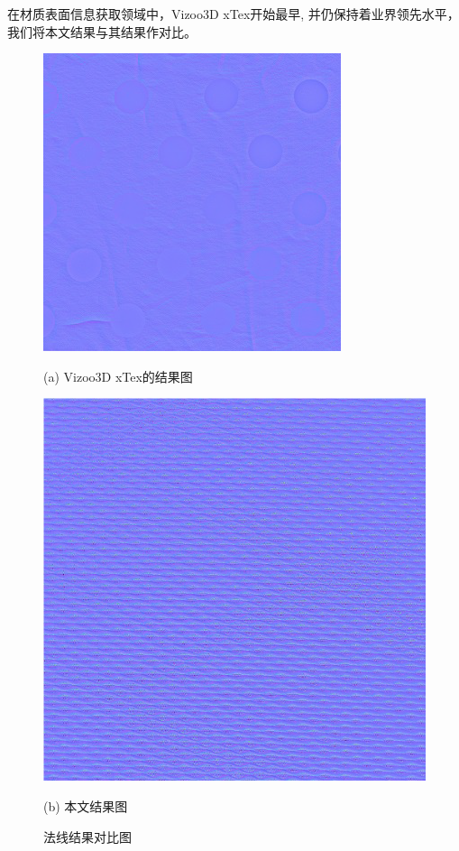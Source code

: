 在材质表面信息获取领域中，Vizoo3D xTex开始最早, 
并仍保持着业界领先水平，我们将本文结果与其结果作对比。
\begin{figure}[htbp]
\begin{minipage}{0.48\linewidth}
\centerline{\includegraphics[width=1.0\linewidth]{figures/faxianduibia.png}}
\centerline{(a) Vizoo3D xTex的结果图 }
\end{minipage}
\begin{minipage}{0.48\linewidth}
\centerline{\includegraphics[width=1.0\linewidth]{figures/faxianduibib.png}}
\centerline{(b) 本文结果图}
\end{minipage}
\caption{法线结果对比图}
\label{fig:faxianjieguoduibi}
\end{figure}
